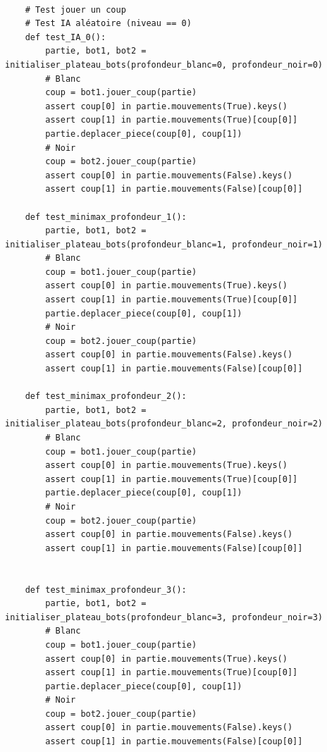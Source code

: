 \documentclass{article}
\begin{document}
\begin{verbatim}

    # Test jouer un coup
    # Test IA aléatoire (niveau == 0)
    def test_IA_0():
        partie, bot1, bot2 = initialiser_plateau_bots(profondeur_blanc=0, profondeur_noir=0)
        # Blanc
        coup = bot1.jouer_coup(partie)
        assert coup[0] in partie.mouvements(True).keys()
        assert coup[1] in partie.mouvements(True)[coup[0]]
        partie.deplacer_piece(coup[0], coup[1])
        # Noir
        coup = bot2.jouer_coup(partie)
        assert coup[0] in partie.mouvements(False).keys()
        assert coup[1] in partie.mouvements(False)[coup[0]]
    
    def test_minimax_profondeur_1():
        partie, bot1, bot2 = initialiser_plateau_bots(profondeur_blanc=1, profondeur_noir=1)
        # Blanc
        coup = bot1.jouer_coup(partie)
        assert coup[0] in partie.mouvements(True).keys()
        assert coup[1] in partie.mouvements(True)[coup[0]]
        partie.deplacer_piece(coup[0], coup[1])
        # Noir
        coup = bot2.jouer_coup(partie)
        assert coup[0] in partie.mouvements(False).keys()
        assert coup[1] in partie.mouvements(False)[coup[0]]
    
    def test_minimax_profondeur_2():
        partie, bot1, bot2 = initialiser_plateau_bots(profondeur_blanc=2, profondeur_noir=2)
        # Blanc
        coup = bot1.jouer_coup(partie)
        assert coup[0] in partie.mouvements(True).keys()
        assert coup[1] in partie.mouvements(True)[coup[0]]
        partie.deplacer_piece(coup[0], coup[1])
        # Noir
        coup = bot2.jouer_coup(partie)
        assert coup[0] in partie.mouvements(False).keys()
        assert coup[1] in partie.mouvements(False)[coup[0]]
        
        
    def test_minimax_profondeur_3():
        partie, bot1, bot2 = initialiser_plateau_bots(profondeur_blanc=3, profondeur_noir=3)
        # Blanc
        coup = bot1.jouer_coup(partie)
        assert coup[0] in partie.mouvements(True).keys()
        assert coup[1] in partie.mouvements(True)[coup[0]]
        partie.deplacer_piece(coup[0], coup[1])
        # Noir
        coup = bot2.jouer_coup(partie)
        assert coup[0] in partie.mouvements(False).keys()
        assert coup[1] in partie.mouvements(False)[coup[0]]
     
\end{verbatim}
\end{document}
